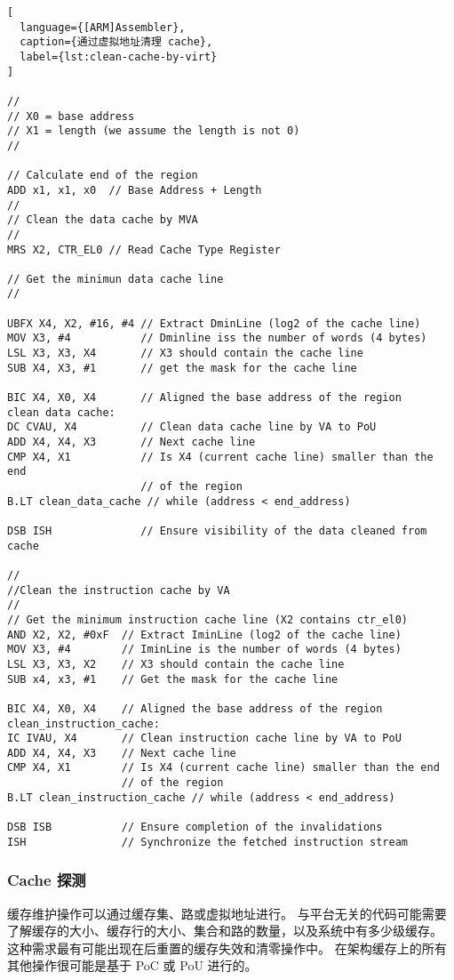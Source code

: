 \begin{lstlisting}[
  language={[ARM]Assembler},
  caption={通过虚拟地址清理 cache},
  label={lst:clean-cache-by-virt}
]

//
// X0 = base address
// X1 = length (we assume the length is not 0)
//

// Calculate end of the region
ADD x1, x1, x0  // Base Address + Length
//
// Clean the data cache by MVA
//
MRS X2, CTR_EL0 // Read Cache Type Register

// Get the minimun data cache line
//

UBFX X4, X2, #16, #4 // Extract DminLine (log2 of the cache line)
MOV X3, #4           // Dminline iss the number of words (4 bytes)
LSL X3, X3, X4       // X3 should contain the cache line
SUB X4, X3, #1       // get the mask for the cache line

BIC X4, X0, X4       // Aligned the base address of the region
clean data cache:
DC CVAU, X4          // Clean data cache line by VA to PoU
ADD X4, X4, X3       // Next cache line
CMP X4, X1           // Is X4 (current cache line) smaller than the end
                     // of the region
B.LT clean_data_cache // while (address < end_address)

DSB ISH              // Ensure visibility of the data cleaned from cache

//
//Clean the instruction cache by VA
//
// Get the minimum instruction cache line (X2 contains ctr_el0)
AND X2, X2, #0xF  // Extract IminLine (log2 of the cache line)
MOV X3, #4        // IminLine is the number of words (4 bytes)
LSL X3, X3, X2    // X3 should contain the cache line
SUB x4, x3, #1    // Get the mask for the cache line

BIC X4, X0, X4    // Aligned the base address of the region
clean_instruction_cache:
IC IVAU, X4       // Clean instruction cache line by VA to PoU
ADD X4, X4, X3    // Next cache line
CMP X4, X1        // Is X4 (current cache line) smaller than the end
                  // of the region
B.LT clean_instruction_cache // while (address < end_address)

DSB ISB           // Ensure completion of the invalidations
ISH               // Synchronize the fetched instruction stream
\end{lstlisting}

\subsubsection{Cache 探测}

缓存维护操作可以通过缓存集、路或虚拟地址进行。
与平台无关的代码可能需要了解缓存的大小、缓存行的大小、集合和路的数量，以及系统中有多少级缓存。
这种需求最有可能出现在后重置的缓存失效和清零操作中。
在架构缓存上的所有其他操作很可能是基于 PoC 或 PoU 进行的。

